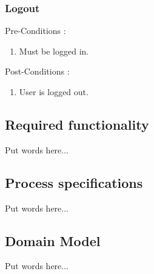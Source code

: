 \documentclass[12pt, oneside]{article}
\begin{document}
			\subsubsection{Logout}
				Pre-Conditions : \begin{enumerate}
							\item Must be logged in.
						     \end{enumerate}
				Post-Conditions : \begin{enumerate}
							\item User is logged out.
						     \end{enumerate}

	\subsection{Required functionality}
		Put words here...
	\subsection{Process specifications}
		Put words here...
	\subsection{ Domain Model}
		Put words here...
\end{document}

